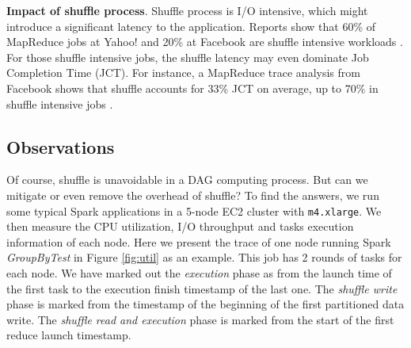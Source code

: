 
\textbf{Impact of shuffle process}. Shuffle process is I/O intensive, which might introduce a significant latency to the application. Reports show that 60\% of MapReduce jobs at Yahoo!
and 20\% at Facebook are shuffle intensive workloads \cite{shufflewatcher}. For those shuffle intensive jobs, the shuffle latency may even dominate Job Completion Time (JCT).
For instance, a MapReduce trace analysis from Facebook shows that shuffle accounts for 33\% JCT on average, up to 70\% in shuffle intensive jobs \cite{managing}.


\subsection{Observations} \label{observation}
Of course, shuffle is unavoidable in a DAG computing process. But can we mitigate or even remove the overhead of shuffle? To find the answers, we run some typical Spark applications in a 5-node EC2 cluster with \texttt{m4.xlarge}. We then measure the CPU utilization, I/O throughput and tasks execution information of each node. Here we present the trace of one node running Spark \textit{GroupByTest} in Figure \ref{fig:util} as an example. This job has 2 rounds of tasks for each node.
We have marked out the \textit{execution} phase as from the launch time of the first task to the execution finish timestamp of the last one. The \textit{shuffle write} phase is marked from the timestamp of the beginning of the first partitioned data write. The \textit{shuffle read and execution} phase is marked from the start of the first reduce launch timestamp.



